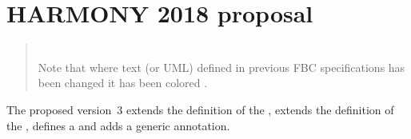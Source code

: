 
\newpage
\section{HARMONY 2018 proposal}

\begin{quote}
 \\ Note that where text (or UML) defined in previous FBC specifications has been changed it has been colored .
\end{quote}

The proposed \FBCPackage version~3 extends the definition of the \FluxObjective, extends the definition of the , defines a \UserConstraint and adds a generic \KeyValuePair annotation.

